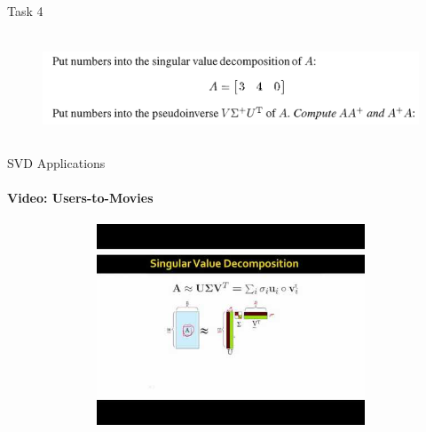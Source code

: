 \documentclass[aspectratio=169]{beamer}
\begin{document}

\begin{frame}[t]{Task 4}
    \framesubtitle{}
    \vspace{-0.5cm}
    \begin{figure}[H]
        \centering\includegraphics[height=3cm,width=1\textwidth,keepaspectratio]{4.png}
        \label{fig:4.png}
    \end{figure}
\end{frame}

\begin{frame}[t]{SVD Applications}
    \framesubtitle{Video: Users-to-Movies}
    \vspace{-0.6cm}
    \begin{figure}[H]
        \href{https://youtu.be/P5mlg91as1c?t=466}{
            \centering\includegraphics[height=6cm,width=1\textwidth,keepaspectratio]{svd_example_stanford.jpg}}
        \label{fig:svd_example_stanford.jpg}
    \end{figure}
\end{frame}
\end{document}
